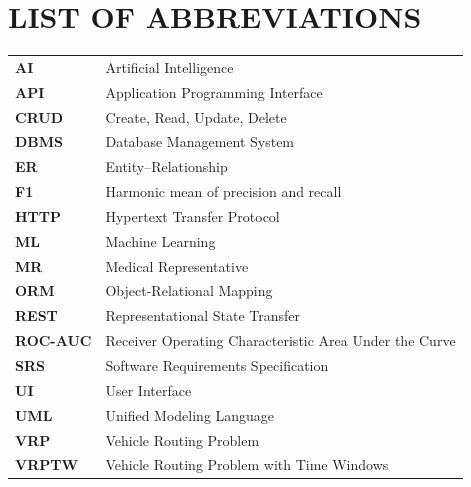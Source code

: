 \documentclass[12pt,a4paper,oneside]{report}
\begin{document}
\chapter*{LIST OF ABBREVIATIONS}
\begin{longtable}{>{\bfseries}p{28mm}p{100mm}}
AI & Artificial Intelligence\\
API & Application Programming Interface\\
CRUD & Create, Read, Update, Delete\\
DBMS & Database Management System\\
ER & Entity--Relationship\\
F1 & Harmonic mean of precision and recall\\
HTTP & Hypertext Transfer Protocol\\
ML & Machine Learning\\
MR & Medical Representative\\
ORM & Object-Relational Mapping\\
REST & Representational State Transfer\\
ROC-AUC & Receiver Operating Characteristic Area Under the Curve\\
SRS & Software Requirements Specification\\
UI & User Interface\\
UML & Unified Modeling Language\\
VRP & Vehicle Routing Problem\\
VRPTW & Vehicle Routing Problem with Time Windows\\
\end{longtable}
\end{document}
